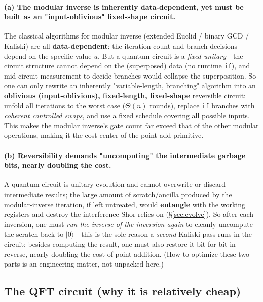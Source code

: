 \documentclass[11pt]{article}
\newcommand{\secref}[1]{\hyperref[#1]{\S\ref*{#1}}}
\begin{document}
\paragraph{(a) The modular inverse is inherently data-dependent, yet must be built as an "input-oblivious" fixed-shape circuit.}
The classical algorithms for modular inverse (extended Euclid / binary GCD / Kaliski) are all \textbf{data-dependent}: the iteration count and branch decisions depend on the specific value $u$.
But a quantum circuit is a \emph{fixed unitary}---the circuit structure cannot depend on the (superposed) data (no runtime \texttt{if}), and mid-circuit measurement to decide branches
would collapse the superposition. So one can only rewrite an inherently "variable-length, branching" algorithm into an \textbf{oblivious (input-oblivious), fixed-length, fixed-shape} reversible circuit:
unfold all iterations to the worst case ($\Theta(n)$ rounds), replace \texttt{if} branches with \emph{coherent controlled swaps}, and use a fixed schedule covering all possible inputs.
This makes the modular inverse's gate count far exceed that of the other modular operations, making it the cost center of the point-add primitive.

\paragraph{(b) Reversibility demands "uncomputing" the intermediate garbage bits, nearly doubling the cost.}
A quantum circuit is unitary evolution and cannot overwrite or discard intermediate results; the large amount of scratch/ancilla produced by the modular-inverse iteration, if left untreated, would \textbf{entangle}
with the working registers and destroy the interference Shor relies on (\secref{sec:evolve}). So after each inversion, one must \emph{run the inverse of the inversion again} to cleanly
$\text{uncompute}$ the scratch back to $\lvert 0\rangle$---this is the sole reason a \emph{second} Kaliski pass runs in the circuit: besides computing the result, one must also
restore it bit-for-bit in reverse, nearly doubling the cost of point addition. (How to optimize these two parts is an engineering matter, not unpacked here.)

\subsection{The QFT circuit (why it is relatively cheap)}
\label{ssec:qft}
\end{document}
